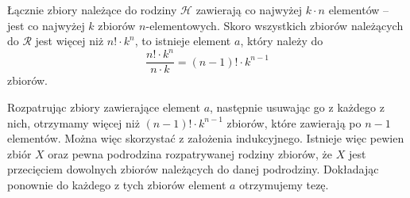 \vspace{10px}

\noindent
Łącznie zbiory należące do rodziny $\mathcal{H}$ zawierają co najwyżej $k \cdot n$ elementów -- jest co najwyżej $k$ zbiorów $n$-elementowych. Skoro wszystkich zbiorów należących do $\mathcal{R}$ jest więcej niż $n! \cdot k^{n}$, to istnieje element $a$, który należy do
\[
	\frac{n! \cdot k^{n}}{n \cdot k} = (n - 1)! \cdot k^{n - 1}
\]
zbiorów.

\vspace{10px}

\noindent
Rozpatrując zbiory zawierające element $a$, następnie usuwając go z każdego z nich, otrzymamy więcej niż $(n - 1)! \cdot k^{n - 1}$ zbiorów, które zawierają po $n - 1$ elementów. Można więc skorzystać z założenia indukcyjnego. Istnieje więc pewien zbiór $X$ oraz pewna podrodzina rozpatrywanej rodziny zbiorów, że $X$ jest przecięciem dowolnych zbiorów należących do danej podrodziny. Dokładając ponownie do każdego z tych zbiorów element $a$ otrzymujemy tezę.




